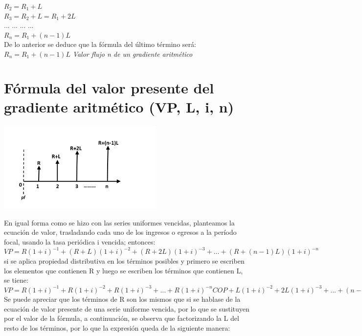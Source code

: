 $R_{2} = R_{1} + L$\\
$R_{3} = R_{2}  + L  = R_{1} + 2L$\\
... ... ... ... \\
$R_{n} = R_{1} + (n-1)L$\\
De lo anterior se deduce que la fórmula del último término será:\\
$R_{n} = R_{1} + (n-1)L$ \hspace{35 pt} \textit{Valor flujo n de un gradiente aritmético}\\



\section{Fórmula del valor presente del gradiente aritmético (VP, L, i, n)}
\begin{center}
	\includegraphics[height=4.5cm]{6_Capitulo/img/ejemplos/6_3}
\end{center}
En igual forma como se hizo con las series uniformes vencidas, planteamos la ecuación de valor, trasladando cada uno de los ingresos o egresos a la período focal, usando la tasa periódica i vencida; entonces:\\

$VP = R(1+i)^{-1} + (R+L)(1+i)^{-2} + (R+2L)(1+i)^{-3} + ... +     (R+(n-1)L)(1+i)^{-n}$\\
si se aplica propiedad distributiva en los términos posibles y primero se escriben los elementos que contienen R y luego se escriben los términos que contienen L, se tiene:\\

$VP = R(1+i)^{-1} + R(1+i)^{-2}+ R(1+i)^{-3} +...+ R(1+i)^{-n} COP  + L(1+i)^{-2} + 2L(1+i)^{-3} + ... + (n-1)L(1+i)^{-n}$ \\
	
	Se puede apreciar que los términos de R son los mismos que si se hablase de la ecuación de valor presente de una serie uniforme vencida, por lo que se sustituyen por el valor de la fórmula, a continuación, se observa que factorizando la L del resto de los términos, por lo que la expresión queda de la siguiente manera: \\
	
